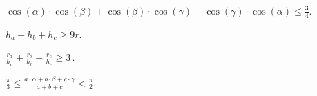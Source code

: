 \begin{problems}
\item
\(\displaystyle
    \cos(\alpha) \cdot \cos(\beta) +
    \cos(\beta) \cdot \cos(\gamma) +
    \cos(\gamma) \cdot \cos(\alpha)
\leq
    \frac{3}{4}
\)\;.

\item
\(\displaystyle
    h_a + h_b + h_c \geq 9 r
\).

\item
\(\displaystyle
    \frac{r_a}{h_a} + \frac{r_b}{h_b} + \frac{r_c}{h_c}
\geq
    3
\)\,.

\item
\(\displaystyle
    \frac{\pi}{3}
\leq
    \frac{a \cdot \alpha + b \cdot \beta + c \cdot \gamma}{a + b + c}
<
    \frac{\pi}{2}
\)\;.

\end{problems}

